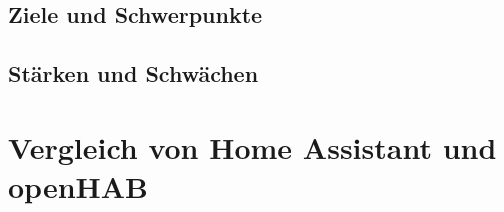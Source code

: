 \subsection{Ziele und Schwerpunkte}
\subsection{Stärken und Schwächen}

\section{Vergleich von Home Assistant und openHAB}
\label{sec:comparison-HAOS-openHAB}

